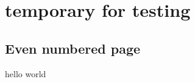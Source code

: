 \documentclass[twoside]{article}
\begin{document}
\tableofcontents

\cleardoublepage{}

\section{temporary for testing}
\newpage
\subsection{Even numbered page}
hello world
%
\end{document}
